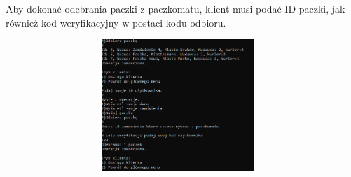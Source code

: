 Aby dokonać odebrania paczki z paczkomatu, klient musi podać ID paczki, jak również kod weryfikacyjny w postaci kodu odbioru.
\begin{center}
\includegraphics[width=13.0cm, height=5.0cm]{Odbior klienta.png}
\end{center}
